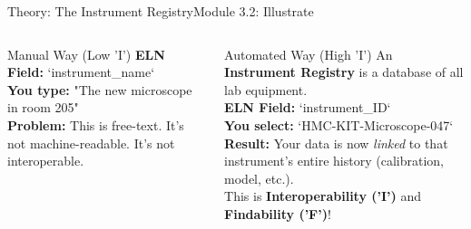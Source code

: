 \begin{frame}{Theory: The Instrument Registry}{Module 3.2: Illustrate}
    
    \begin{columns}
            \begin{block}{Manual Way (Low 'I')}
            \textbf{ELN Field:} `instrument\_name` \\
            \textbf{You type:} "The new microscope in room 205" \\
            \pause
            \textbf{Problem:} This is free-text. It's not machine-readable. It's not interoperable. \\
        \end{block}
        
        \begin{block}{Automated Way (High 'I')}
            An \textbf{Instrument Registry} is a database of all lab equipment. \\
            \pause
            \textbf{ELN Field:} `instrument\_ID` \\
            \textbf{You select:} `HMC-KIT-Microscope-047` \\
            \pause
            \textbf{Result:} Your data is now \emph{linked} to that instrument's entire history (calibration, model, etc.). \\
            This is \textbf{Interoperability ('I')} and \textbf{Findability ('F')}!
        \end{block}
    \end{columns}
\end{frame}

